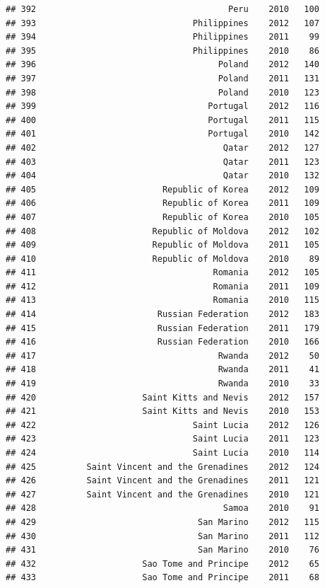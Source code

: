 \documentclass[
]{book}
\begin{document}
\begin{verbatim}
## 392                                      Peru    2010   100
## 393                               Philippines    2012   107
## 394                               Philippines    2011    99
## 395                               Philippines    2010    86
## 396                                    Poland    2012   140
## 397                                    Poland    2011   131
## 398                                    Poland    2010   123
## 399                                  Portugal    2012   116
## 400                                  Portugal    2011   115
## 401                                  Portugal    2010   142
## 402                                     Qatar    2012   127
## 403                                     Qatar    2011   123
## 404                                     Qatar    2010   132
## 405                         Republic of Korea    2012   109
## 406                         Republic of Korea    2011   109
## 407                         Republic of Korea    2010   105
## 408                       Republic of Moldova    2012   102
## 409                       Republic of Moldova    2011   105
## 410                       Republic of Moldova    2010    89
## 411                                   Romania    2012   105
## 412                                   Romania    2011   109
## 413                                   Romania    2010   115
## 414                        Russian Federation    2012   183
## 415                        Russian Federation    2011   179
## 416                        Russian Federation    2010   166
## 417                                    Rwanda    2012    50
## 418                                    Rwanda    2011    41
## 419                                    Rwanda    2010    33
## 420                     Saint Kitts and Nevis    2012   157
## 421                     Saint Kitts and Nevis    2010   153
## 422                               Saint Lucia    2012   126
## 423                               Saint Lucia    2011   123
## 424                               Saint Lucia    2010   114
## 425          Saint Vincent and the Grenadines    2012   124
## 426          Saint Vincent and the Grenadines    2011   121
## 427          Saint Vincent and the Grenadines    2010   121
## 428                                     Samoa    2010    91
## 429                                San Marino    2012   115
## 430                                San Marino    2011   112
## 431                                San Marino    2010    76
## 432                     Sao Tome and Principe    2012    65
## 433                     Sao Tome and Principe    2011    68

\end{verbatim}
\end{document}
